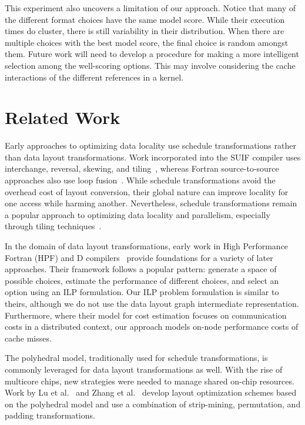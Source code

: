 \documentclass[sigconf,review=true]{acmart}
\begin{document}
This experiment also uncovers a limitation of our approach.
Notice that many of the different format choices have the same model score.
While their execution times do cluster, there is still variability in their distribution.
When there are multiple choices with   the best model score, the final choice is random amongst them.
Future work will need to develop a procedure for making a more intelligent selection among the well-scoring options. 
This may involve considering the cache interactions of the different references in a kernel. 





\section{Related Work}

Early approaches to optimizing data locality use schedule transformations rather than data layout transformations. 
Work incorporated into the SUIF compiler uses interchange, reversal, skewing, and tiling~\cite{wolf1991data}, whereas Fortran source-to-source approaches also use loop fusion~\cite{mckinley1996improving}.
While schedule transformations avoid the overhead cost of layout conversion, their global nature can improve locality for one access while harming another.
Nevertheless, schedule transformations remain a popular approach to optimizing data locality and parallelism, 
especially through tiling techniques~\cite{bondhugula2008pluto,bertolacci2015parameterized,bondhugula2016diamond,bandishti2012tiling,unat2016tida}.

In the domain of data layout transformations, early work in High Performance Fortran (HPF) and D compilers~\cite{bixby1994automatic,kennedy1995automatic,kennedy1998automatic} provide foundations for a variety of later approaches.
Their framework follows a popular pattern: generate a space of possible choices, estimate the performance of different choices, and select an option using an ILP formulation. 
Our ILP problem formulation is similar to theirs, although we do not use the data layout graph intermediate representation.
Furthermore, where their model for cost estimation focuses on communication costs in a distributed context, our approach models on-node performance costs of cache misses.

The polyhedral model, traditionally used for schedule transformations, is commonly leveraged for data layout transformations as well.
With the rise of multicore chips, new strategies were needed to manage shared on-chip resources. 
Work by Lu et al.~\cite{lu2009data} and Zhang et al.~\cite{zhang2011optimizing} develop layout optimization schemes based on the polyhedral model and use a combination of strip-mining, permutation, and padding transformations.
\end{document}
